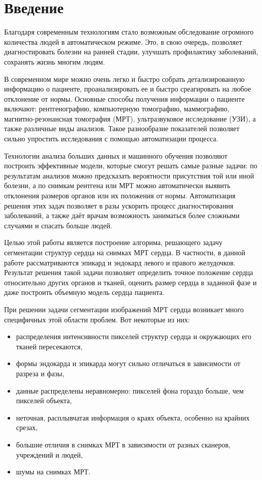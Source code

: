 \section{Введение}

Благодаря современным технологиям стало возможным обследование огромного количества людей в автоматическом режиме. Это, в свою очередь, позволяет диагностировать болезни на ранней стадии, улучшать профилактику заболеваний, сохранять жизнь многим людям.

В современном мире можно очень легко и быстро собрать детализированную информацию о пациенте, проанализировать ее и быстро среагировать на любое отклонение от нормы. Основные способы получения информации о пациенте включают: рентгенографию, компьютерную томографию, маммографию, магнитно-резонансная томография (МРТ), ультразвуковое исследование (УЗИ), а также различные виды анализов. Такое разнообразие показателей позволяет сильно упростить исследования с помощью автоматизации процесса.

Технологии анализа больших данных и машинного обучения позволяют построить эффективные модели, которые смогут решать самые разные задачи: по результатам анализов можно предсказать вероятности присутствия той или иной болезни, а по снимкам рентгена или МРТ можно автоматически выявить отклонения размеров органов или их положения от нормы. Автоматизация решения этих задач позволяет в разы ускорить процесс диагностирования заболеваний, а также даёт врачам возможность заниматься более сложными случаями и спасать больше людей.

Целью этой работы является построение алгорима, решающего задачу сегментации структур сердца на снимках МРТ сердца. В частности, в данной работе рассматриваются эпикард и эндокард левого и правого желудочков. Результат решения такой задачи позволяет определить точное положение сердца относительно других органов и тканей, оценить размер сердца в заданной фазе и даже построить объемную модель сердца пациента.

При решении задачи сегментации изображений МРТ сердца возникает много специфичных этой области проблем. Вот некоторые из них:

\begin{itemize}
  \item распределения интенсивности пикселей структур сердца и окружающих его тканей пересекаются,
  \item формы эндокарда и эпикарда могут сильно отличаться в зависимости от разреза и фазы,
  \item данные распределены неравномерно: пикселей фона гораздо больше, чем пикселей объекта,
  \item неточная, расплывчатая информация о краях объекта, особенно на крайних срезах,
  \item большие отличия в снимках МРТ в зависимости от разных сканеров, учреждений и людей,
  \item шумы на снимках МРТ.
\end{itemize}

